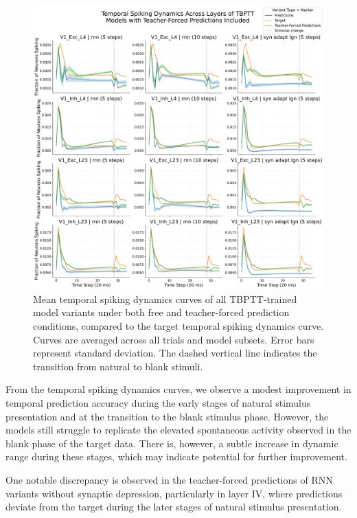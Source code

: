 \begin{figure}
    \centering
    \includegraphics[width=\linewidth]{img/plots/tbptt_models_forced_included_model_synchrony_curve.pdf}
    \caption{Mean temporal spiking dynamics curves of all TBPTT-trained model variants under both free and teacher-forced prediction conditions, compared to the target temporal spiking dynamics curve. Curves are averaged across all trials and model subsets. Error bars represent standard deviation. The dashed vertical line indicates the transition from natural to blank stimuli.}
    \label{fig:free_vs_teacher_forced_synchrony}
\end{figure}

From the temporal spiking dynamics curves, we observe a modest improvement in temporal prediction accuracy during the early stages of natural stimulus presentation and at the transition to the blank stimulus phase. However, the models still struggle to replicate the elevated spontaneous activity observed in the blank phase of the target data. There is, however, a subtle increase in dynamic range during these stages, which may indicate potential for further improvement.

One notable discrepancy is observed in the teacher-forced predictions of RNN variants without synaptic depression, particularly in layer IV, where predictions deviate from the target during the later stages of natural stimulus presentation. 

